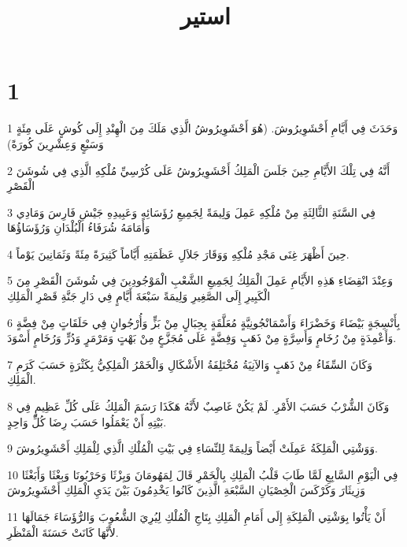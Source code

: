 

\title{استير}


\chapter{1}

\par 1 وَحَدَثَ فِي أَيَّامِ أَحْشَوِيرُوشَ. (هُوَ أَحْشَوِيرُوشُ الَّذِي مَلَكَ مِنَ الْهِنْدِ إِلَى كُوشٍ عَلَى مِئَةٍ وَسَبْعٍ وَعِشْرِينَ كُورَةً)
\par 2 أَنَّهُ فِي تِلْكَ الأَيَّامِ حِينَ جَلَسَ الْمَلِكُ أَحْشَوِيرُوشُ عَلَى كُرْسِيِّ مُلْكِهِ الَّذِي فِي شُوشَنَ الْقَصْرِ
\par 3 فِي السَّنَةِ الثَّالِثَةِ مِنْ مُلْكِهِ عَمِلَ وَلِيمَةً لِجَمِيعِ رُؤَسَائِهِ وَعَبِيدِهِ جَيْشِ فَارِسَ وَمَادِي وَأَمَامَهُ شُرَفَاءُ الْبُلْدَانِ وَرُؤَسَاؤُهَا
\par 4 حِينَ أَظْهَرَ غِنَى مَجْدِ مُلْكِهِ وَوَقَارَ جَلاَلِ عَظَمَتِهِ أَيَّاماً كَثِيرَةً مِئَةً وَثَمَانِينَ يَوْماً.
\par 5 وَعِنْدَ انْقِضَاءِ هَذِهِ الأَيَّامِ عَمِلَ الْمَلِكُ لِجَمِيعِ الشَّعْبِ الْمَوْجُودِينَ فِي شُوشَنَ الْقَصْرِ مِنَ الْكَبِيرِ إِلَى الصَّغِيرِ وَلِيمَةً سَبْعَةَ أَيَّامٍ فِي دَارِ جَنَّةِ قَصْرِ الْمَلِكِ
\par 6 بِأَنْسِجَةٍ بَيْضَاءَ وَخَضْرَاءَ وَأَسْمَانْجُونِيَّةٍ مُعَلَّقَةٍ بِحِبَالٍ مِنْ بَزٍّ وَأُرْجُوانٍ فِي حَلَقَاتٍ مِنْ فِضَّةٍ وَأَعْمِدَةٍ مِنْ رُخَامٍ وَأَسِرَّةٍ مِنْ ذَهَبٍ وَفِضَّةٍ عَلَى مُجَزَّعٍ مِنْ بَهْتٍ وَمَرْمَرٍ وَدُرٍّ وَرُخَامٍ أَسْوَدَ.
\par 7 وَكَانَ السِّقَاءُ مِنْ ذَهَبٍ وَالآنِيَةُ مُخْتَلِفَةُ الأَشْكَالِ وَالْخَمْرُ الْمَلِكِيُّ بِكَثْرَةٍ حَسَبَ كَرَمِ الْمَلِكِ.
\par 8 وَكَانَ الشُّرْبُ حَسَبَ الأَمْرِ. لَمْ يَكُنْ غَاصِبٌ لأَنَّهُ هَكَذَا رَسَمَ الْمَلِكُ عَلَى كُلِّ عَظِيمٍ فِي بَيْتِهِ أَنْ يَعْمَلُوا حَسَبَ رِضَا كُلِّ وَاحِدٍ.
\par 9 وَوَشْتِي الْمَلِكَةُ عَمِلَتْ أَيْضاً وَلِيمَةً لِلنِّسَاءِ فِي بَيْتِ الْمُلْكِ الَّذِي لِلْمَلِكِ أَحْشَوِيرُوشَ.
\par 10 فِي الْيَوْمِ السَّابِعِ لَمَّا طَابَ قَلْبُ الْمَلِكِ بِالْخَمْرِ قَالَ لِمَهُومَانَ وَبِزْثَا وَحَرْبُونَا وَبِغْثَا وَأَبَغْثَا وَزِيثَارَ وَكَرْكَسَ الْخِصْيَانِ السَّبْعَةِ الَّذِينَ كَانُوا يَخْدِمُونَ بَيْنَ يَدَيِ الْمَلِكِ أَحْشَوِيرُوشَ
\par 11 أَنْ يَأْتُوا بِوَشْتِي الْمَلِكَةِ إِلَى أَمَامِ الْمَلِكِ بِتَاجِ الْمُلْكِ لِيُرِيَ الشُّعُوبَ وَالرُّؤَسَاءَ جَمَالَهَا لأَنَّهَا كَانَتْ حَسَنَةَ الْمَنْظَرِ.
